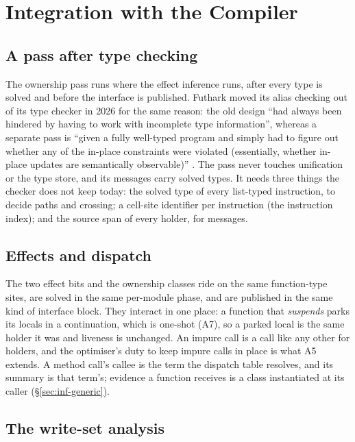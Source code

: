 \section{Integration with the Compiler}
\label{sec:compiler}

\subsection{A pass after type checking}

The ownership pass runs where the effect inference runs, after every type is solved and before the
interface is published. Futhark moved its alias checking out of its type checker in 2026 for the same
reason: the old design ``had always been hindered by having to work with incomplete type
information'', whereas a separate pass is ``given a fully well-typed program and simply had to figure
out whether any of the in-place constraints were violated (essentially, whether in-place updates are
semantically observable)'' \citep{henriksen2026rewrite}. The pass never touches unification or the
type store, and its messages carry solved types. It needs three things the checker does not keep today:
the solved type of every list-typed instruction, to decide paths and crossing; a cell-site identifier
per instruction (the instruction index); and the source span of every holder, for messages.

\subsection{Effects and dispatch}

The two effect bits and the ownership classes ride on the same function-type sites, are solved in the
same per-module phase, and are published in the same kind of interface block. They interact in one
place: a function that \emph{suspends} parks its locals in a continuation, which is one-shot (A7), so a
parked local is the same holder it was and liveness is unchanged. An impure call is a call like any
other for holders, and the optimiser's duty to keep impure calls in place is what A5 extends. A method
call's callee is the term the dispatch table resolves, and its summary is that term's; evidence a
function receives is a class instantiated at its caller (\S\ref{sec:inf-generic}).

\subsection{The write-set analysis}

